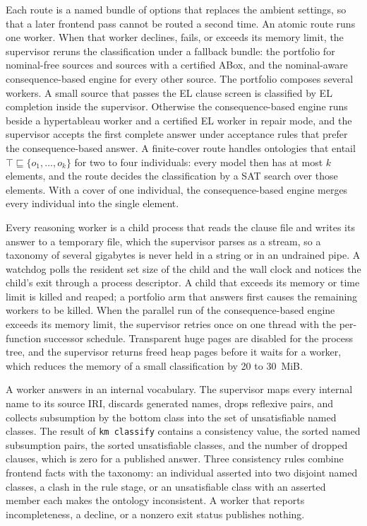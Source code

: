 Each route is a named bundle of options that replaces the ambient settings, so
that a later frontend pass cannot be routed a second time.  An atomic route
runs one worker.  When that worker declines, fails, or exceeds its memory
limit, the supervisor reruns the classification under a fallback bundle: the
portfolio for nominal-free sources and sources with a certified ABox, and the
nominal-aware consequence-based engine for every other source.  The portfolio
composes several workers.  A small source that passes the EL clause screen is
classified by EL completion inside the supervisor.  Otherwise the
consequence-based engine runs beside a hypertableau worker and a certified EL
worker in repair mode, and the supervisor accepts the first complete answer
under acceptance rules that prefer the consequence-based answer.  A
finite-cover route handles ontologies that entail $\top\sqsubseteq\{o_1,\ldots,
o_k\}$ for two to four individuals: every model then has at most $k$ elements,
and the route decides the classification by a SAT search over those elements.
With a cover of one individual, the consequence-based engine merges every
individual into the single element.

Every reasoning worker is a child process that reads the clause file and
writes its answer to a temporary file, which the supervisor parses as a
stream, so a taxonomy of several gigabytes is never held in a string or in an
undrained pipe.  A watchdog polls the resident set size of the child and the
wall clock and notices the child's exit through a process descriptor.  A child
that exceeds its memory or time limit is killed and reaped; a portfolio arm
that answers first causes the remaining workers to be killed.  When the
parallel run of the consequence-based engine exceeds its memory limit, the
supervisor retries once on one thread with the per-function successor
schedule.  Transparent huge pages are disabled for the process tree, and the
supervisor returns freed heap pages before it waits for a worker, which
reduces the memory of a small classification by 20 to 30~MiB.

A worker answers in an internal vocabulary.  The supervisor maps every internal
name to its source IRI, discards generated names, drops reflexive pairs, and
collects subsumption by the bottom class into the set of unsatisfiable named
classes.  The result of \texttt{km classify} contains a consistency value, the
sorted named subsumption pairs, the sorted unsatisfiable classes, and the
number of dropped clauses, which is zero for a published answer.  Three
consistency rules combine frontend facts with the taxonomy: an individual
asserted into two disjoint named classes, a clash in the rule stage, or an
unsatisfiable class with an asserted member each makes the ontology
inconsistent.  A worker that reports incompleteness, a decline, or a nonzero
exit status publishes nothing.
